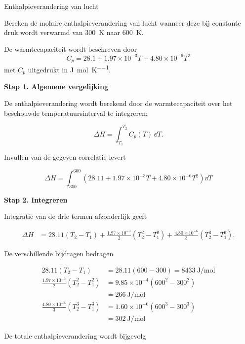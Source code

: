 \begin{voorbeeld}{Enthalpieverandering van lucht}

Bereken de molaire enthalpieverandering van lucht wanneer deze bij constante druk wordt verwarmd van \SI{300}{\kelvin} naar \SI{600}{\kelvin}.

De warmtecapaciteit wordt beschreven door
\[
C_p = 28.1 + 1.97\times10^{-3}T + 4.80\times10^{-6}T^2
\]
met $C_p$ uitgedrukt in
\si{\joule\per\mole\per\kelvin}.
\\

\bigskip

\textbf{Stap 1. Algemene vergelijking}

De enthalpieverandering wordt berekend door de warmtecapaciteit over het beschouwde temperatuursinterval te integreren:

\begin{equation*}
\Delta H = \int_{T_1}^{T_2} C_p(T)\,\dd T.
\end{equation*}

Invullen van de gegeven correlatie levert

\begin{equation*}
\Delta H = \int_{300}^{600} \left(28.11 + 1.97\times10^{-3}T + 4.80\times10^{-6}T^2 \right)\dd T
\end{equation*}

\bigskip

\textbf{Stap 2. Integreren}

Integratie van de drie termen afzonderlijk geeft

\begin{align*}
\Delta H
&=
28.11(T_2-T_1)
+
\frac{1.97\times10^{-3}}{2}
\left(T_2^2-T_1^2\right)
+
\frac{4.80\times10^{-6}}{3}
\left(T_2^3-T_1^3\right).
\end{align*}

De verschillende bijdragen bedragen

\begin{align*}
28.11(T_2-T_1) &= 28.11(600-300) = \SI{8433}{\joule\per\mole} \\
\frac{1.97\times10^{-3}}{2} (T_2^2-T_1^2) &= 9.85\times10^{-4} (600^2-300^2) \\
&=\SI{266}{\joule\per\mole}
\\
\frac{4.80\times10^{-6}}{3} (T_2^3-T_1^3) &= 1.60\times10^{-6} (600^3-300^3) \\
&= \SI{302}{\joule\per\mole}
\end{align*}

De totale enthalpieverandering wordt bijgevolg


\end{voorbeeld}
